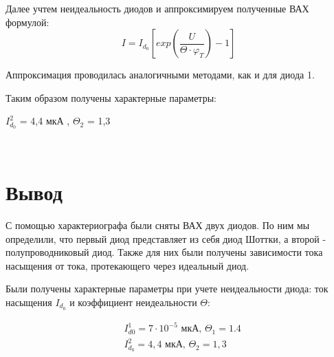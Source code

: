 \documentclass[a4paper, 12pt]{article}
\begin{document}
Далее учтем неидеальность диодов и аппроксимируем полученные ВАХ формулой:
\begin{equation}
\label{form: I_d0}
    I = I_{d_0}[exp(\frac{U}{\Theta\cdot\varphi_T})-1]
\end{equation}

Аппроксимация проводилась аналогичными методами, как и для диода 1.

Таким образом получены характерные параметры:
\begin{center}
    $I^2_{d_0}$ = 4,4 мкА , $\Theta_2$ = 1,3
\end{center}



\
\section*{Вывод}
С помощью характериографа были сняты ВАХ двух диодов. По ним мы определили, что первый диод представляет из себя диод Шоттки, а второй - полупроводниковый диод. Также для них были получены зависимости тока насыщения от тока, протекающего через идеальный диод.

Были получены характерные параметры при учете неидеальности диода: ток насыщения $I_{d_0}$ и коэффициент неидеальности $\Theta$:

\begin{align}
    & I^1_{d0} = 7 \cdot 10^{-5} \text{ мкА}, \, \Theta_1 = 1.4 \\
    & I^2_{d_0} = 4,4 \text{ мкА}, \, \Theta_2 = 1,3
\end{align}
\end{document}
